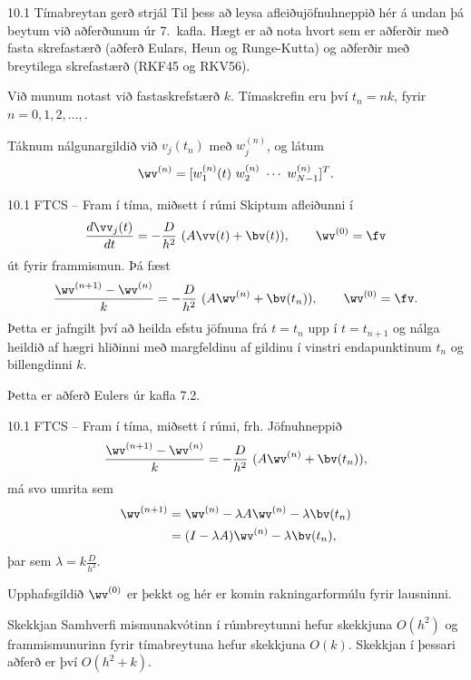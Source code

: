 \begin{frame}{10.1 Tímabreytan gerð strjál}
Til þess að leysa afleiðujöfnuhneppið hér á undan þá beytum við aðferðunum
úr 7.~kafla. Hægt er að nota hvort sem er aðferðir með fasta skrefastærð
(aðferð Eulars, Heun og Runge-Kutta) og aðferðir með breytilega skrefastærð
(RKF45 og RKV56). \pause

\medskip
Við munum notast við fastaskrefstærð $k$. Tímaskrefin eru því
$t_n = n k$, fyrir $n=0,1,2,\ldots,$. \pause

\medskip
Táknum nálgunargildið við 
$v_j(t_n)$ með $w_j^{(n)}$, og látum
$$
  \wv^{(n)} = [w_1^{(n)}(t) \ w_2^{(n)} \ \cdots \ w_{N-1}^{(n)} ]^T. 
$$

\end{frame}

\begin{frame}{10.1 FTCS -- Fram í tíma, miðsett í rúmi}
Skiptum afleiðunni í 
$$ 
 \frac{d \vv_j(t)}{d t} =  -\frac{D}{h^2}\  (A\vv(t) + \bv(t)), \qquad \wv^{(0)}=\fv
$$
út fyrir frammismun. Þá fæst
$$ 
 \frac{\wv^{(n+1)} - \wv^{(n)}}{ k} =  -\frac{D}{h^2}\  (A\wv^{(n)} + \bv(t_n)), 
 \qquad \wv^{(0)}=\fv.
$$\pause
Þetta er jafngilt því að heilda efstu jöfnuna frá $t=t_n$ upp í $t=t_{n+1}$ og
nálga heildið af hægri hliðinni með margfeldinu af gildinu í vinstri endapunktinum 
$t_n$ og billengdinni $k$. \pause

Þetta er aðferð Eulers úr kafla 7.2.
\end{frame}
 

\begin{frame}{10.1 FTCS -- Fram í tíma, miðsett í rúmi, frh.}
 Jöfnuhneppið
 $$ 
 \frac{\wv^{(n+1)} - \wv^{(n)}}{ k} =  -\frac{D}{h^2}\  (A\wv^{(n)} + \bv(t_n)), 
$$
má svo umrita sem
\begin{align*}
 \wv^{(n+1)} &= \wv^{(n)} -\lambda A\wv^{(n)} - \lambda \bv(t_n) \\
 & = (I-\lambda A) \wv^{(n)} - \lambda \bv(t_n),
\end{align*}
þar sem $\lambda = k\frac{D}{h^2}$. \pause
 
 Upphafsgildið $\wv^{(0)}$ er þekkt og hér er komin rakningarformúlu
 fyrir lausninni.  \pause
 
 \begin{block}{Skekkjan}
  Samhverfi mismunakvótinn í rúmbreytunni hefur skekkjuna
 $O(h^2)$ og frammismunurinn fyrir tímabreytuna hefur skekkjuna $O(k)$. 
 Skekkjan í þessari aðferð er því $O(h^2 + k)$.
 \end{block}
\end{frame}
 
